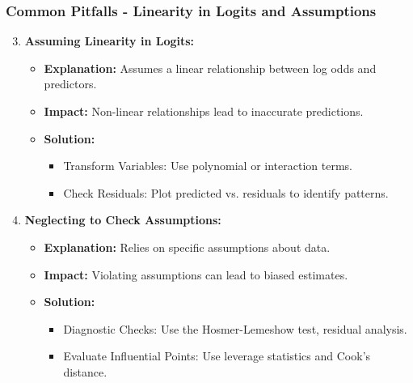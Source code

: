 \documentclass[aspectratio=169]{beamer}
\begin{document}
\begin{frame}[fragile]
    \frametitle{Common Pitfalls - Linearity in Logits and Assumptions}
    \begin{enumerate}
        \setcounter{enumi}{2}
        \item \textbf{Assuming Linearity in Logits:}
        \begin{itemize}
            \item \textbf{Explanation:} Assumes a linear relationship between log odds and predictors.
            \item \textbf{Impact:} Non-linear relationships lead to inaccurate predictions.
            \item \textbf{Solution:}
            \begin{itemize}
                \item Transform Variables: Use polynomial or interaction terms.
                \item Check Residuals: Plot predicted vs. residuals to identify patterns.
            \end{itemize}
        \end{itemize}
        
        \item \textbf{Neglecting to Check Assumptions:}
        \begin{itemize}
            \item \textbf{Explanation:} Relies on specific assumptions about data.
            \item \textbf{Impact:} Violating assumptions can lead to biased estimates.
            \item \textbf{Solution:}
            \begin{itemize}
                \item Diagnostic Checks: Use the Hosmer-Lemeshow test, residual analysis.
                \item Evaluate Influential Points: Use leverage statistics and Cook's distance.
            \end{itemize}
        \end{itemize}
    \end{enumerate}
\end{frame}
\end{document}
